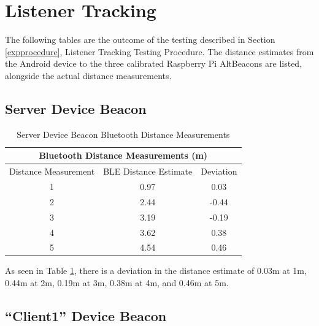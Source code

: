 \documentclass[11pt,a4paper,headinclude=false,footinclude=false]{scrreprt}
\begin{document}
\section{\texorpdfstring{Listener Tracking
\label{clienttrackresults}}{Listener Tracking }}\label{listener-tracking-2}

The following tables are the outcome of the testing described in Section
\ref{expprocedure}, Listener Tracking Testing Procedure. The distance
estimates from the Android device to the three calibrated Raspberry Pi
AltBeacons are listed, alongside the actual distance measurements.

\subsection{Server Device Beacon}\label{server-device-beacon}

\begin{table}[H]
\centering
    \begin{tabular}{||c|c|c||}
    \hline
    \multicolumn{3}{|c|}{\textbf{Bluetooth Distance Measurements (m)}} \\
    \hline\hline
    Distance Measurement & BLE Distance Estimate & Deviation \\
    \hline
    1 & 0.97 & 0.03 \\
    \hline
    2 & 2.44 & -0.44 \\
    \hline
    3 & 3.19 & -0.19 \\
    \hline
    4 & 3.62 & 0.38 \\
    \hline
    5 & 4.54 & 0.46 \\
    \hline\hline
    \end{tabular}
    \caption{Server Device Beacon Bluetooth Distance Measurements}
    \label{serverBLEmeasurement}
\end{table}

As seen in Table \ref{serverBLEmeasurement}, there is a deviation in the
distance estimate of 0.03m at 1m, 0.44m at 2m, 0.19m at 3m, 0.38m at 4m,
and 0.46m at 5m.

\subsection{\texorpdfstring{``Client1'' Device
Beacon}{Client1 Device Beacon}}\label{client1-device-beacon}
\end{document}

